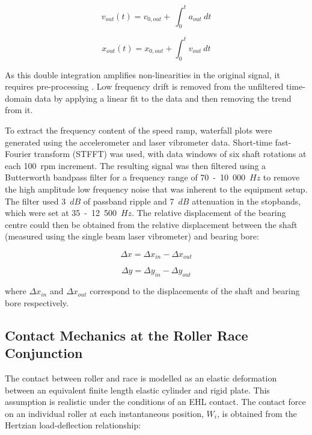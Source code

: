 \begin{equation}\label{accelvelointeg}
	v_{out}\left(t\right)=v_{0,out}+\ \int_{0}^{t}{a_{out}\ dt}
\end{equation}

\begin{equation}\label{acceldispinteg}
	x_{out}\left(t\right)=x_{0,out}+\int_{0}^{t}{v_{out}\ dt}
\end{equation}

As this double integration amplifies non-linearities in the original signal, it requires pre-processing \cite{Takeda2014}. Low frequency drift is removed from the unfiltered time-domain data by applying a linear fit to the data and then removing the trend from it.  

To extract the frequency content of the speed ramp, waterfall plots were generated using the accelerometer and laser vibrometer data. Short-time fast-Fourier transform (STFFT) was used, with data windows of six shaft rotations at each 100~rpm increment. The resulting signal was then filtered using a Butterworth bandpass filter for a frequency range of 70~-~10~000~$Hz$ to remove the high amplitude low frequency noise that was inherent to the equipment setup. The filter used 3~$dB$ of passband ripple and 7~$dB$ attenuation in the stopbands, which were set at 35~-~12~500~$Hz$.  
The relative displacement of the bearing centre could then be obtained from the relative displacement between the shaft (measured using the single beam laser vibrometer) and bearing bore:

\begin{equation}\label{relativdispaccelx}
	\Delta x = \Delta x_{in} - \Delta x_{out}
\end{equation}

\begin{equation}\label{relativdispaccely}
	\Delta y = \Delta y_{in} - \Delta y_{out}
\end{equation}

where $\Delta x_{in}$ and $\Delta x_{out}$ correspond to the displacements of the shaft and bearing bore respectively. 

\subsection{Contact Mechanics at the Roller Race Conjunction} \label{Contact mechanics experimental tribodynamics}

The contact between roller and race is modelled as an elastic deformation between an equivalent finite length elastic cylinder and rigid plate. This assumption is realistic under the conditions of an EHL contact. The contact force on an individual roller at each instantaneous position, $W_i$, is obtained from the Hertzian load-deflection relationship:

